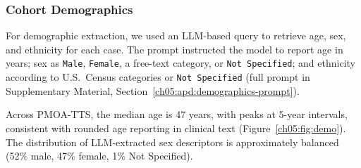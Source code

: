 \ChFiveHeadingOnly
\subsubsection{Cohort Demographics}
\label{ch05:sec:cohort-demographics}

For demographic extraction, we used an LLM-based query to retrieve age, sex, and ethnicity for each case.
The prompt instructed the model to report age in years; sex as \texttt{Male}, \texttt{Female}, a free-text category, or \texttt{Not Specified}; and ethnicity according to U.S.\ Census categories or \texttt{Not Specified} (full prompt in Supplementary Material, Section~\ref{ch05:apd:demographics-prompt}).

Across PMOA-TTS, the median age is 47 years, with peaks at 5-year intervals, consistent with rounded age reporting in clinical text (Figure~\ref{ch05:fig:demo}).
The distribution of LLM-extracted sex descriptors is approximately balanced (52\% male, 47\% female, 1\% Not Specified).
